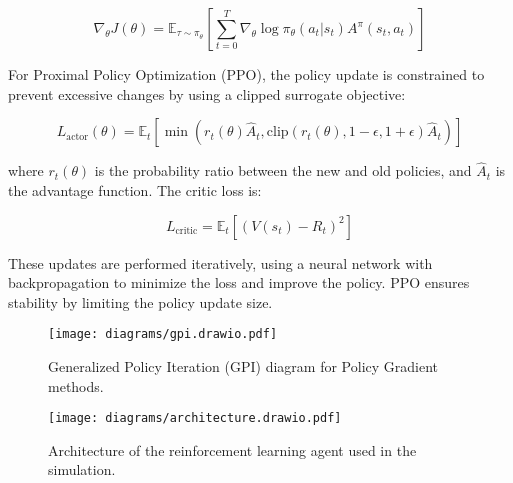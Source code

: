 \documentclass[11pt]{article}
\begin{document}
    \[
        \nabla_\theta J(\theta) = \mathbb{E}_{\tau \sim \pi_\theta} \left[ \sum_{t=0}^{T} \nabla_\theta \log \pi_\theta(a_t | s_t) A^\pi(s_t, a_t) \right]
    \]

    For Proximal Policy Optimization (PPO), the policy update is constrained to prevent excessive changes by using a clipped surrogate objective:

    \[
        L_{\text{actor}}(\theta) = \mathbb{E}_t \left[ \min \left( r_t(\theta) \hat{A}_t, \text{clip}(r_t(\theta), 1-\epsilon, 1+\epsilon) \hat{A}_t \right) \right]
    \]

    where \( r_t(\theta) \) is the probability ratio between the new and old policies, and \( \hat{A}_t \) is the advantage function.
    The critic loss is:

    \[
        L_{\text{critic}} = \mathbb{E}_t \left[ (V(s_t) - R_t)^2 \right]
    \]

    These updates are performed iteratively, using a neural network with backpropagation to minimize the loss and improve the policy.
    PPO ensures stability by limiting the policy update size.

    \begin{figure}[htb]
        \centering
        \texttt{[image: diagrams/gpi.drawio.pdf]}
        \caption{Generalized Policy Iteration (GPI) diagram for Policy Gradient methods.}
        \label{fig:gpi}
    \end{figure}

    \begin{figure}[htb]
        \centering
        \texttt{[image: diagrams/architecture.drawio.pdf]}
        \caption{Architecture of the reinforcement learning agent used in the simulation.}
        \label{fig:agent}
    \end{figure}
\end{document}
